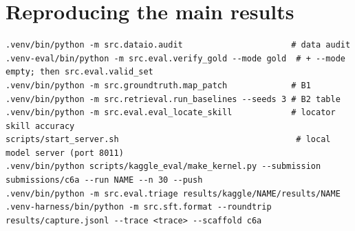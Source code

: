 \documentclass[10pt,a4paper]{article}
\newcommand{\1}{\mathbb{1}}
\begin{document}
\section{Reproducing the main results}
\begin{lstlisting}
.venv/bin/python -m src.dataio.audit                      # data audit
.venv-eval/bin/python -m src.eval.verify_gold --mode gold  # + --mode empty; then src.eval.valid_set
.venv/bin/python -m src.groundtruth.map_patch             # B1
.venv/bin/python -m src.retrieval.run_baselines --seeds 3 # B2 table
.venv/bin/python -m src.eval.eval_locate_skill            # locator skill accuracy
scripts/start_server.sh                                    # local model server (port 8011)
.venv/bin/python scripts/kaggle_eval/make_kernel.py --submission submissions/c6a --run NAME --n 30 --push
.venv/bin/python -m src.eval.triage results/kaggle/NAME/results/NAME
.venv-harness/bin/python -m src.sft.format --roundtrip results/capture.jsonl --trace <trace> --scaffold c6a
\end{lstlisting}
\end{document}
